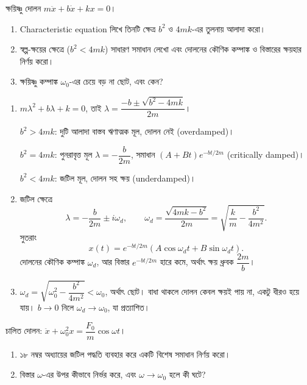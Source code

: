 \documentclass[11pt]{article}
\begin{document}
 ক্ষয়িষ্ণু দোলন $m\ddot{x} + b\dot{x} + kx = 0$।
\begin{enumerate}
  \item Characteristic equation লিখে তিনটি ক্ষেত্র $b^{2}$ ও $4mk$-এর তুলনায়
        আলাদা করো।
  \item স্বল্প-ক্ষয়ের ক্ষেত্রে ($b^{2} < 4mk$) সাধারণ সমাধান লেখো এবং
        দোলনের কৌণিক কম্পাঙ্ক ও বিস্তারের ক্ষয়হার নির্ণয় করো।
  \item ক্ষয়িষ্ণু কম্পাঙ্ক $\omega_{0}$-এর চেয়ে বড় না ছোট, এবং কেন?
\end{enumerate}

\begin{sol}
\begin{enumerate}
  \item $m\lambda^{2}+b\lambda+k = 0$, তাই
        $\lambda = \dfrac{-b \pm \sqrt{b^{2}-4mk}}{2m}$।

        $b^{2} > 4mk$: দুটি আলাদা বাস্তব ঋণাত্মক মূল, দোলন নেই
        (overdamped)।

        $b^{2} = 4mk$: পুনরাবৃত্ত মূল $\lambda = -\dfrac{b}{2m}$, সমাধান
        $(A+Bt)e^{-bt/2m}$ (critically damped)।

        $b^{2} < 4mk$: জটিল মূল, দোলন সহ ক্ষয় (underdamped)।
  \item জটিল ক্ষেত্রে
        \[
          \lambda = -\frac{b}{2m} \pm i\omega_{d}, \qquad
          \omega_{d} = \frac{\sqrt{4mk-b^{2}}}{2m}
          = \sqrt{\frac{k}{m} - \frac{b^{2}}{4m^{2}}} .
        \]
        সুতরাং
        \[
          x(t) = e^{-bt/2m}\left( A\cos\omega_{d}t + B\sin\omega_{d}t \right) .
        \]
        দোলনের কৌণিক কম্পাঙ্ক $\omega_{d}$, আর বিস্তার $e^{-bt/2m}$ হারে
        কমে, অর্থাৎ ক্ষয় ধ্রুবক $\dfrac{2m}{b}$।
  \item $\omega_{d} = \sqrt{\omega_{0}^{2} - \dfrac{b^{2}}{4m^{2}}}
        < \omega_{0}$, অর্থাৎ ছোট। বাধা থাকলে দোলন কেবল ক্ষয়ই পায় না, একটু
        ধীরও হয়ে যায়। $b \to 0$ নিলে $\omega_{d} \to \omega_{0}$, যা
        প্রত্যাশিত।
\end{enumerate}
\end{sol}

 চালিত দোলন: $\ddot{x} + \omega_{0}^{2}x =
\dfrac{F_{0}}{m}\cos\omega t$।
\begin{enumerate}
  \item ১৮ নম্বর অধ্যায়ের জটিল পদ্ধতি ব্যবহার করে একটি বিশেষ সমাধান
        নির্ণয় করো।
  \item বিস্তার $\omega$-এর উপর কীভাবে নির্ভর করে, এবং $\omega \to
        \omega_{0}$ হলে কী ঘটে?
\end{enumerate}
\end{document}
